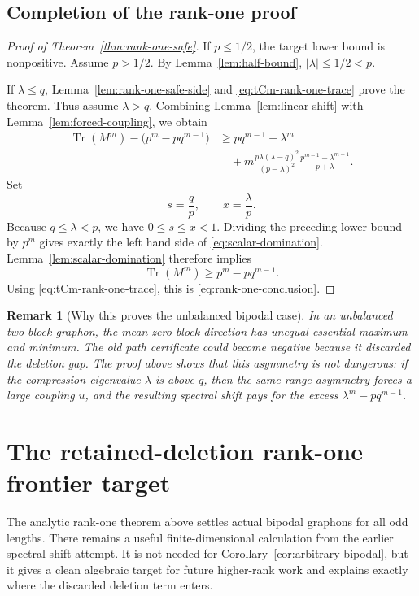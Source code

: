 \documentclass[11pt]{article}
\newtheorem{remark}[theorem]{Remark}
\newcommand{\Tr}{\operatorname{Tr}}
\begin{document}
\subsection{Completion of the rank-one proof}

\begin{proof}[Proof of Theorem~\ref{thm:rank-one-safe}]
If $p\le1/2$, the target lower bound is nonpositive.  Assume $p>1/2$.  By Lemma~\ref{lem:half-bound}, $|\lambda|\le1/2<p$.

If $\lambda\le q$, Lemma~\ref{lem:rank-one-safe-side} and \eqref{eq:tCm-rank-one-trace} prove the theorem.  Thus assume $\lambda>q$.  Combining Lemma~\ref{lem:linear-shift} with Lemma~\ref{lem:forced-coupling}, we obtain
\[
\begin{aligned}
\Tr(M^m)-\bigl(p^m-pq^{m-1}\bigr)
&\ge pq^{m-1}-\lambda^m \\
&\quad
 +m\frac{p\lambda(\lambda-q)^2}{(p-\lambda)^2}
      \frac{p^{m-1}-\lambda^{m-1}}{p+\lambda}.
\end{aligned}
\]
Set
\[
        s=\frac qp,
        \qquad
        x=\frac\lambda p.
\]
Because $q\le\lambda<p$, we have $0\le s\le x<1$.  Dividing the preceding lower bound by $p^m$ gives exactly the left hand side of \eqref{eq:scalar-domination}.  Lemma~\ref{lem:scalar-domination} therefore implies
\[
        \Tr(M^m)\ge p^m-pq^{m-1}.
\]
Using \eqref{eq:tCm-rank-one-trace}, this is \eqref{eq:rank-one-conclusion}.
\end{proof}

\begin{remark}[Why this proves the unbalanced bipodal case]
In an unbalanced two-block graphon, the mean-zero block direction has unequal essential maximum and minimum.  The old path certificate could become negative because it discarded the deletion gap.  The proof above shows that this asymmetry is not dangerous: if the compression eigenvalue $\lambda$ is above $q$, then the same range asymmetry forces a large coupling $u$, and the resulting spectral shift pays for the excess $\lambda^m-pq^{m-1}$.
\end{remark}

\section{The retained-deletion rank-one frontier target}

The analytic rank-one theorem above settles actual bipodal graphons for all odd lengths.  There remains a useful finite-dimensional calculation from the earlier spectral-shift attempt.  It is not needed for Corollary~\ref{cor:arbitrary-bipodal}, but it gives a clean algebraic target for future higher-rank work and explains exactly where the discarded deletion term enters.
\end{document}
